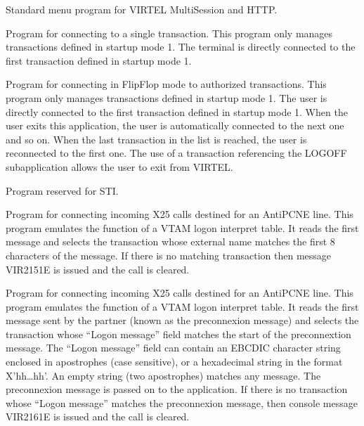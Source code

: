 \documentclass[letterpaper,10pt,english]{sphinxmanual}
\begin{document}
\begin{description}
\sphinxAtStartPar
Standard menu program for VIRTEL Multi\sphinxhyphen{}Session and HTTP.

\sphinxAtStartPar
Program for connecting to a single transaction. This program only manages transactions defined in startup mode 1. The terminal is directly connected to the first transaction defined in startup mode 1.

\sphinxAtStartPar
Program for connecting in Flip\sphinxhyphen{}Flop mode to authorized transactions. This program only manages transactions defined in startup mode 1. The user is directly connected to the first transaction defined in startup mode 1. When the user exits this application, the user is automatically connected to the next one and so on. When the last transaction in the list is reached, the user is reconnected to the first one. The use of a transaction referencing the LOGOFF subapplication allows the user to exit from VIRTEL.

\sphinxAtStartPar
Program reserved for STI.

\sphinxAtStartPar
Program for connecting incoming X25 calls destined for an AntiPCNE line. This program emulates the function of a VTAM logon interpret table. It reads the first message and selects the transaction whose external name matches the first 8 characters of the message. If there is no matching transaction then message VIR2151E is issued and the call is cleared.

\sphinxAtStartPar
Program for connecting incoming X25 calls destined for an AntiPCNE line. This program emulates the function of a VTAM logon interpret table. It reads the first message sent by the partner (known as the pre\sphinxhyphen{}connexion message) and selects the transaction whose “Logon message” field matches the start of the pre\sphinxhyphen{}connextion message. The “Logon message” field can contain an EBCDIC character string enclosed in apostrophes (case sensitive), or a hexadecimal string in the format X’hh…hh’. An empty string (two apostrophes) matches any message. The pre\sphinxhyphen{}connexion message is passed on to the application. If there is no transaction whose “Logon message” matches the pre\sphinxhyphen{}connexion message, then console message VIR2161E is issued and the call is cleared.


\end{description}
\end{document}
